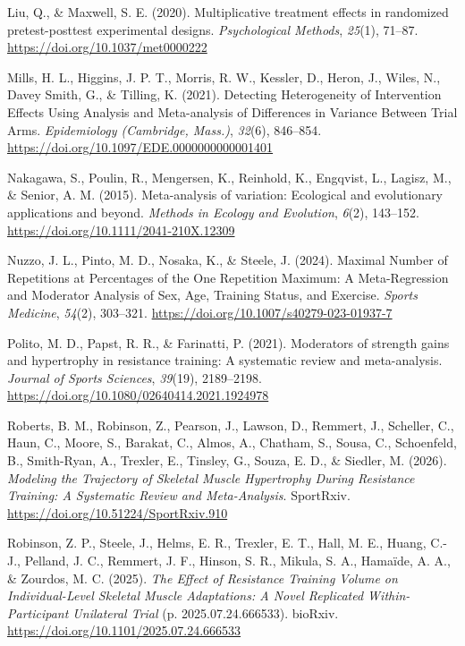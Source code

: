 \documentclass[
]{article}
\newlength{\cslhangindent}
\newenvironment{CSLReferences}[2] %
 {\begin{list}{}{%
  \setlength{\itemindent}{0pt}
  \setlength{\leftmargin}{0pt}
  \setlength{\parsep}{0pt}
  \ifodd #1
   \setlength{\leftmargin}{\cslhangindent}
   \setlength{\itemindent}{-1\cslhangindent}
  \fi
  \setlength{\itemsep}{#2\baselineskip}}}
 {\end{list}}
\begin{document}
\begin{CSLReferences}{1}{0}
Liu, Q., \& Maxwell, S. E. (2020). Multiplicative treatment effects in
randomized pretest-posttest experimental designs. \emph{Psychological
Methods}, \emph{25}(1), 71--87. \url{https://doi.org/10.1037/met0000222}

Mills, H. L., Higgins, J. P. T., Morris, R. W., Kessler, D., Heron, J.,
Wiles, N., Davey Smith, G., \& Tilling, K. (2021). Detecting
{Heterogeneity} of {Intervention Effects Using Analysis} and
{Meta-analysis} of {Differences} in {Variance Between Trial Arms}.
\emph{Epidemiology (Cambridge, Mass.)}, \emph{32}(6), 846--854.
\url{https://doi.org/10.1097/EDE.0000000000001401}

Nakagawa, S., Poulin, R., Mengersen, K., Reinhold, K., Engqvist, L.,
Lagisz, M., \& Senior, A. M. (2015). Meta-analysis of variation:
Ecological and evolutionary applications and beyond. \emph{Methods in
Ecology and Evolution}, \emph{6}(2), 143--152.
\url{https://doi.org/10.1111/2041-210X.12309}

Nuzzo, J. L., Pinto, M. D., Nosaka, K., \& Steele, J. (2024). Maximal
{Number} of {Repetitions} at {Percentages} of the {One Repetition
Maximum}: {A Meta-Regression} and {Moderator Analysis} of {Sex}, {Age},
{Training Status}, and {Exercise}. \emph{Sports Medicine}, \emph{54}(2),
303--321. \url{https://doi.org/10.1007/s40279-023-01937-7}

Polito, M. D., Papst, R. R., \& Farinatti, P. (2021). Moderators of
strength gains and hypertrophy in resistance training: {A} systematic
review and meta-analysis. \emph{Journal of Sports Sciences},
\emph{39}(19), 2189--2198.
\url{https://doi.org/10.1080/02640414.2021.1924978}

Roberts, B. M., Robinson, Z., Pearson, J., Lawson, D., Remmert, J.,
Scheller, C., Haun, C., Moore, S., Barakat, C., Almos, A., Chatham, S.,
Sousa, C., Schoenfeld, B., Smith-Ryan, A., Trexler, E., Tinsley, G.,
Souza, E. D., \& Siedler, M. (2026). \emph{Modeling the {Trajectory} of
{Skeletal Muscle Hypertrophy During Resistance Training}: {A Systematic
Review} and {Meta-Analysis}}. SportRxiv.
\url{https://doi.org/10.51224/SportRxiv.910}

Robinson, Z. P., Steele, J., Helms, E. R., Trexler, E. T., Hall, M. E.,
Huang, C.-J., Pelland, J. C., Remmert, J. F., Hinson, S. R., Mikula, S.
A., Hamaïde, A. A., \& Zourdos, M. C. (2025). \emph{The {Effect} of
{Resistance Training Volume} on {Individual-Level Skeletal Muscle
Adaptations}: {A Novel Replicated Within-Participant Unilateral Trial}}
(p. 2025.07.24.666533). bioRxiv.
\url{https://doi.org/10.1101/2025.07.24.666533}


\end{CSLReferences}
\end{document}
